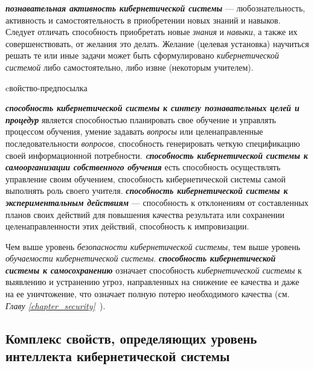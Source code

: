 \textbf{\textit{познавательная активность кибернетической системы}} --- любознательность, активность и самостоятельность в приобретении новых знаний и навыков. Следует отличать способность приобретать новые \textit{знания} и \textit{навыки}, а также их совершенствовать, от желания это делать. Желание (целевая установка) научиться решать те или иные задачи может быть сформулировано \textit{кибернетической системой} либо самостоятельно, либо извне (некоторым учителем).

\begin{SCn}
\begin{scnrelfromlist}{cвойство-предпосылка}
\end{scnrelfromlist}
\end{SCn}

\textbf{\textit{способность кибернетической системы к синтезу познавательных целей и процедур}} является способностью планировать свое обучение и управлять процессом обучения, умение задавать \textit{вопросы} или целенаправленные последовательности \textit{вопросов}, способность генерировать четкую спецификацию своей информационной потребности. \textbf{\textit{cпособность кибернетической системы к самоорганизации собственного обучения}} есть способность осуществлять управление своим обучением, способность кибернетической системы самой выполнять роль своего учителя. \textbf{\textit{способность кибернетической системы к экспериментальным действиям}} --- способность к отклонениям от составленных планов своих действий для повышения качества результата или сохранении целенаправленности этих действий, способность к импровизации.

Чем выше уровень \textit{безопасности кибернетической системы}, тем выше уровень \textit{обучаемости кибернетической системы}.
\textbf{\textit{способность кибернетической системы к самосохранению}} означает способность \textit{кибернетической системы} к выявлению и устранению угроз, направленных на снижение ее качества и даже на ее уничтожение, что означает полную потерю необходимого качества (см. \textit{Главу \ref{chapter_security}~}).

\subsection{Комплекс свойств, определяющих уровень интеллекта кибернетической системы}
{\label{sec_cyb_syst_intelligence_quality}} 

